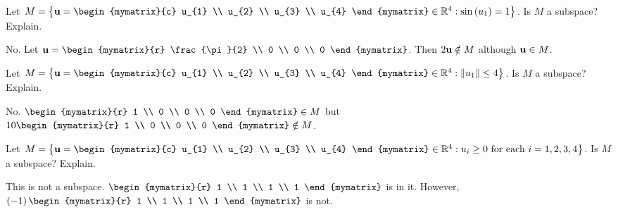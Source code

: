 \begin{enumialphparenastyle}
\begin{ex} Let $M=\set{\vect{u}=\begin{mymatrix}{c}
u_{1} \\
u_{2} \\
u_{3} \\
u_{4}
\end{mymatrix} \in 
\R^{4}:\sin \tup{u_{1}} =1}$. Is $M$ a subspace?
Explain.
\begin{sol}
No. Let $\vect{u}=\begin{mymatrix}{r}
\frac{\pi }{2} \\
0 \\
0 \\
0
\end{mymatrix}$. Then $2\mbox{\bf u}\notin M$ although $\mbox{\bf u}\in M$.
\end{sol}
\end{ex}

\begin{ex} Let $M=\set{\vect{u}=\begin{mymatrix}{c}
u_{1} \\
u_{2} \\
u_{3} \\
u_{4}
\end{mymatrix} \in 
\R^{4}:\norm{u_{1}} \leq 4}$. Is $M$ a
subspace? Explain.
\begin{sol}
No. $\begin{mymatrix}{r}
1 \\
0 \\
0 \\
0
\end{mymatrix} \in M$ but $10\begin{mymatrix}{r}
1 \\
0 \\
0 \\
0
\end{mymatrix} \notin M$.
\end{sol}
\end{ex}

\begin{ex} Let $M=\set{\vect{u}=\begin{mymatrix}{c}
u_{1} \\
u_{2} \\
u_{3} \\
u_{4}
\end{mymatrix} \in 
\R^{4}:u_{i}\geq 0\text{ for each }i=1,2,3,4}$. Is $M$ a
subspace? Explain.
\begin{sol}
This is not a subspace. $\begin{mymatrix}{r}
1 \\
1 \\
1 \\
1
\end{mymatrix} $
is in it. However, $\tup{-1} \begin{mymatrix}{r}
1 \\
1 \\
1 \\
1
\end{mymatrix} $ is not.
\end{sol}
\end{ex}


\end{enumialphparenastyle}
